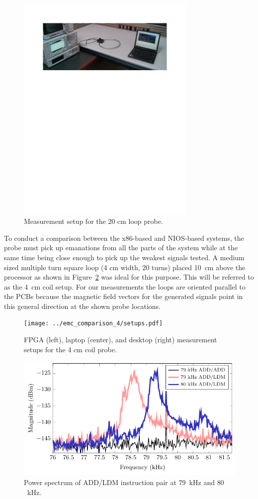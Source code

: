 \begin{figure}[htb]
\centering
\includegraphics[bb=0.94in 7.49in 7.56in 10.01in,clip=true,width=3.4in]{../TEMC_SAVAT/setup.pdf}
\caption{Measurement setup for the 20 cm loop probe.}
\label{large_setup}
\end{figure}

To conduct a comparison between the x86-based and NIOS-based systems, the probe must pick up emanations from all the parts of the system while at the same time being close enough to pick up the weakest signals tested. A medium sized multiple turn square loop (4 cm width, 20 turns) placed 10~cm above the processor as shown in Figure~\ref{small_setup} was ideal for this purpose. This will be referred to as the 4~cm coil setup. For our measurements the loops are oriented parallel to the PCBs because the magnetic field vectors for the generated signals point in this general direction at the shown probe locations.

\begin{figure}[htb]
\centering
\texttt{[image: ../emc\_comparison\_4/setups.pdf]}
\caption{FPGA (left), laptop (center), and desktop (right) measurement setups for the 4 cm coil probe.}
\label{small_setup}
\end{figure}

\begin{figure}[htb]
\centering
\includegraphics[width=5in]{../TEMC_SAVAT/spect_add_ldm.pdf}
\caption{Power spectrum of ADD/LDM instruction pair at $79$~kHz and $80$~kHz.}
\label{ADD-LDM-Spectrum}
\end{figure}

